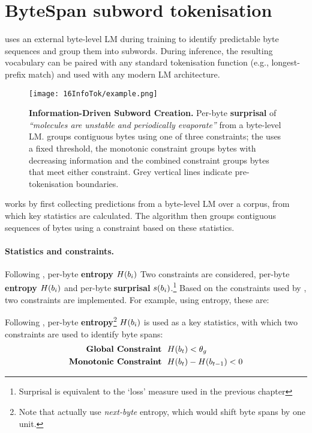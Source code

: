 \section{ByteSpan subword tokenisation}\label{sec:16-bytespan}

\bytespan uses an external byte-level LM during training to identify predictable byte sequences and group them into subwords. During inference, the resulting vocabulary can be paired with any standard tokenisation function (e.g., longest-prefix match) and used with any modern LM architecture. %

\begin{figure}[!t]
    \centering
    \texttt{[image: 16InfoTok/example.png]}
    \caption{\textbf{Information-Driven Subword Creation.}
    Per-byte \textbf{surprisal} of \textit{\enquote{molecules are unstable and periodically evaporate}} from a byte-level LM. \bytespan groups contiguous bytes using one of three constraints; the  uses a fixed threshold, the monotonic constraint groups bytes with decreasing information and the combined constraint groups bytes that meet either constraint. Grey vertical lines indicate pre-tokenisation boundaries.
    }
    \label{fig:16-example}
\end{figure}

\bytespan works by first collecting predictions from a byte-level LM over a corpus, from which key statistics are calculated. The algorithm then groups contiguous sequences of bytes using a constraint based on these statistics.

\paragraph{Statistics and constraints.} Following \citet{pagnoni2024byte}, per-byte \textbf{entropy} \(H(b_i)\) Two constraints are considered, per-byte \textbf{entropy} \(H(b_i)\) and per-byte \textbf{surprisal} \(s(b_i)\).\footnote{Surprisal is equivalent to the `loss' measure used in the previous chapter} Based on the constraints used by \citet{pagnoni2024byte}, two constraints are implemented. For example, using entropy, these are:


Following \citet{pagnoni2024byte}, per-byte \textbf{entropy}\footnote{Note that \citet{pagnoni2024byte} actually use \emph{next-byte} entropy, which would shift byte spans by one unit.} \(H(b_i)\) is used as a key statistics, with which two constraints are used to identify byte spans: 
\begin{align}
    \mathrm{\textbf{Global~Constraint}} &~~ H(b_t) < \theta_g \\
    \mathrm{\textbf{Monotonic~Constraint}} &~~ H(b_t) - H(b_{t-1}) < 0 
\end{align}

